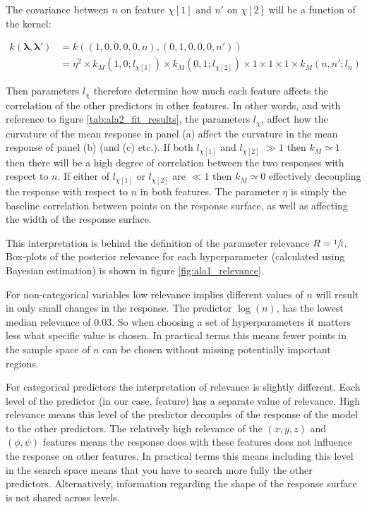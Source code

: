 The covariance between $n$ on feature $\chi[1]$ and $n'$ on $\chi[2]$ will be a function of the kernel:

\begin{equation}
\begin{split}
    k(\mathbf{\lambda}, \mathbf{\lambda}')& = k\left((1, 0, 0, 0, 0, n), (0, 1, 0, 0, 0, n')\right) \\
    & = \eta^{2}\times k_{M}\left(1, 0; l_{\chi[1]}\right) \times k_{M}\left(0, 1; l_{\chi[2]}\right) \times 1 \times 1\times 1 \times k_{M}(n, n'; l_{n})
\end{split}
\end{equation}

Then  parameters $l_{\chi}$ therefore determine how much each feature affects the correlation of the other predictors in other features. In other words, and with reference to figure \ref{tab:ala2_fit_results}, the parameters $l_{\chi}$, affect how  the curvature of the mean response in panel (a) affect the curvature in the mean response of panel (b) (and (c) etc.). If both $l_{\chi[1]}$ and $l_{\chi[2]}$ $\gg 1$ then $k_{M} \simeq 1$ then there will be a high degree of correlation between the two responses with respect to $n$. If either of $l_{\chi[1]}$ or $l_{\chi[2]}$ are $\ll 1$ then $k_{M} \simeq 0$ effectively decoupling the response with respect to $n$ in both features. The parameter $\eta$ is simply the baseline correlation between points on the response surface, as well as affecting the width of the response surface.  

This interpretation is behind the definition of the parameter relevance $R = \sfrac{1}{l}$. Box-plots of the posterior relevance for each hyperparameter (calculated using Bayesian estimation) is shown in figure \ref{fig:ala1_relevance}.   

For non-categorical variables low relevance implies different values of $n$ will result in only small changes in the response. The predictor  $\log{(n)}$, has the lowest median relevance of $0.03$. So when choosing a set of hyperparameters it matters less what specific value is chosen. In practical terms this means fewer points in the sample space of $n$ can be chosen without missing potentially important regions. 

For categorical predictors the interpretation of relevance is slightly different. Each level of the predictor (in our case, feature) has a separate value of relevance. High relevance means this level of the predictor  decouples of the response of the model to the other predictors. The relatively high relevance of the $(x,y,z)$ and $(\phi, \psi)$ features means the response does with these features does not influence the response on other features. In practical terms this means including this level in the search space means that you have to search more fully the other predictors. Alternatively, information regarding the shape of the response surface is not shared across levels. 

